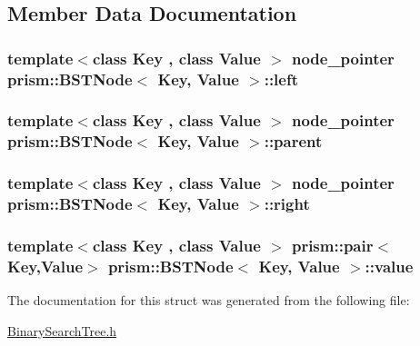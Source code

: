 \subsection{Member Data Documentation}
\subsubsection[{\texorpdfstring{left}{left}}]{\setlength{\rightskip}{0pt plus 5cm}template$<$class Key , class Value $>$ {\bf node\+\_\+pointer} {\bf prism\+::\+B\+S\+T\+Node}$<$ Key, Value $>$\+::left}\hypertarget{structprism_1_1_b_s_t_node_a3d97dd7eb80c576ddc2004c03da6a85a}{}\label{structprism_1_1_b_s_t_node_a3d97dd7eb80c576ddc2004c03da6a85a}
\subsubsection[{\texorpdfstring{parent}{parent}}]{\setlength{\rightskip}{0pt plus 5cm}template$<$class Key , class Value $>$ {\bf node\+\_\+pointer} {\bf prism\+::\+B\+S\+T\+Node}$<$ Key, Value $>$\+::parent}\hypertarget{structprism_1_1_b_s_t_node_a7d52cc6b076a5745f5e20eb2582a8823}{}\label{structprism_1_1_b_s_t_node_a7d52cc6b076a5745f5e20eb2582a8823}
\subsubsection[{\texorpdfstring{right}{right}}]{\setlength{\rightskip}{0pt plus 5cm}template$<$class Key , class Value $>$ {\bf node\+\_\+pointer} {\bf prism\+::\+B\+S\+T\+Node}$<$ Key, Value $>$\+::right}\hypertarget{structprism_1_1_b_s_t_node_a4d29a1dc9bcb5f6fb5b73e0bdfc1ace0}{}\label{structprism_1_1_b_s_t_node_a4d29a1dc9bcb5f6fb5b73e0bdfc1ace0}
\subsubsection[{\texorpdfstring{value}{value}}]{\setlength{\rightskip}{0pt plus 5cm}template$<$class Key , class Value $>$ {\bf prism\+::pair}$<$Key,Value$>$ {\bf prism\+::\+B\+S\+T\+Node}$<$ Key, Value $>$\+::value}\hypertarget{structprism_1_1_b_s_t_node_aee53d06b367f8861e13c8857301b9d4d}{}\label{structprism_1_1_b_s_t_node_aee53d06b367f8861e13c8857301b9d4d}


The documentation for this struct was generated from the following file\+:\begin{DoxyCompactItemize}
\item 
\hyperlink{_binary_search_tree_8h}{Binary\+Search\+Tree.\+h}\end{DoxyCompactItemize}
